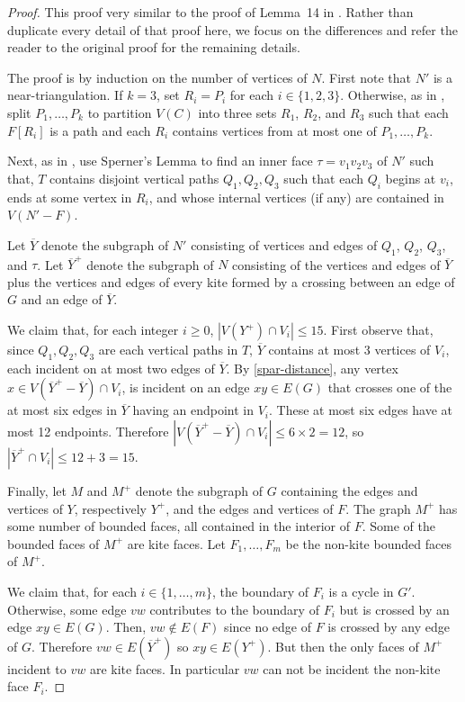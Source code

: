 \documentclass{patmorin}
\begin{document}
\begin{proof}
  This proof very similar to the proof of Lemma~14 in \citet{dujmovic.joret.ea:planar}. Rather than duplicate every detail of that proof here, we focus on the differences and refer the reader to the original proof for the remaining details.
  
  The proof is by induction on the number of vertices of $N$.
  First note that $N'$ is a near-triangulation.  If $k=3$, set $R_i=P_i$ for each $i\in\{1,2,3\}$.  Otherwise, as in \citet{dujmovic.joret.ea:planar}, split $P_1,\ldots,P_k$ to partition $V(C)$ into three sets $R_1$, $R_2$, and $R_3$ such that each $F[R_i]$ is a path and each $R_i$ contains vertices from at most one of $P_1,\ldots,P_k$. 
  
  Next, as in \citet{dujmovic.joret.ea:planar}, use Sperner's Lemma to find an inner face $\tau=v_1v_2v_3$ of $N'$ such that, $T$ contains disjoint vertical paths $Q_1,Q_2,Q_3$ such that each $Q_i$ begins at $v_i$, ends at some vertex in $R_i$, and whose internal vertices (if any) are contained in $V(N'-F)$.
  
  Let $\overline{Y}$ denote the subgraph of $N'$ consisting of vertices and edges of $Q_1$, $Q_2$, $Q_3$, and $\tau$.  Let $\overline{Y}^+$ denote the subgraph of $N$ consisting of the vertices and edges of $\overline{Y}$ plus the vertices and edges of every kite formed by a crossing between an edge of $G$ and an edge of $\overline{Y}$.
  
  We claim that, for each integer $i\ge 0$, $|V(Y^+)\cap V_i|\le 15$.  First observe that, since $Q_1,Q_2,Q_3$ are each vertical paths in $T$,  $\overline{Y}$ contains at most 3 vertices of $V_i$, each incident on at most two edges of $\overline{Y}$.  By \eqref{spar-distance}, any vertex $x\in V(\overline{Y}^+-\overline{Y})\cap V_i$, is incident on an edge $xy\in E(G)$ that crosses one of the at most six edges in $\overline{Y}$ having an endpoint in $V_i$.  These at most six edges have at most 12 endpoints.  Therefore $|V(\overline{Y}^+-\overline{Y})\cap V_i|\le 6\times 2=12$, so $|\overline{Y}^+\cap V_i|\le 12+3=15$.
  
  Finally, let $M$ and $M^+$ denote the subgraph of $G$ containing the edges and vertices of $Y$, respectively $Y^+$, and the edges and vertices of $F$.  The graph $M^+$ has some number of bounded faces, all contained in the interior of $F$. Some of the bounded faces of $M^+$ are kite faces. Let $F_1,\ldots,F_m$ be the non-kite bounded faces of $M^+$.  
  
  We claim that, for each $i\in\{1,\ldots,m\}$, the boundary of $F_i$ is a cycle in $G'$.  Otherwise, some edge $vw$ contributes to the boundary of $F_i$ but is crossed by an edge $xy\in E(G)$. Then, $vw\not\in E(F)$ since no edge of $F$ is crossed by any edge of $G$. Therefore $vw\in E(\overline{Y}^+)$ so $xy\in E(Y^+)$. But then the only faces of $M^+$ incident to $vw$ are kite faces.  In particular $vw$ can not be incident the non-kite face $F_i$.
  

\end{proof}
\end{document}
